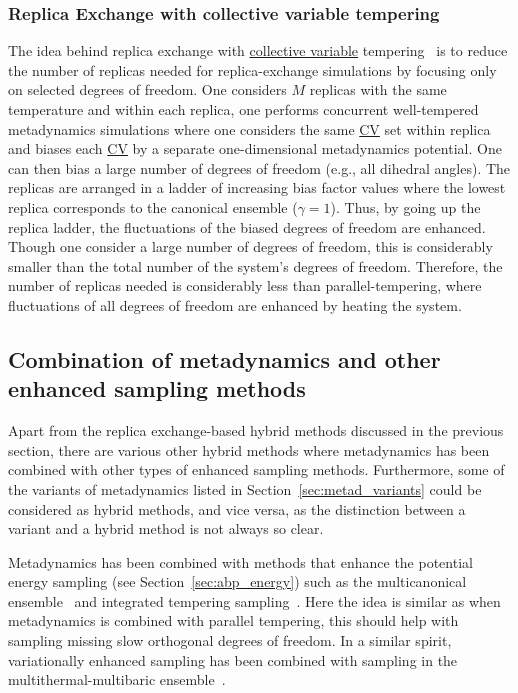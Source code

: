 \documentclass[9pt,review]{livecoms}
\begin{document}
\subsubsection{Replica Exchange with collective variable tempering}

The idea behind replica exchange with \hyperlink{ref:CV} {collective variable} tempering~\cite{Gil-Ley_JCTC-2015} is to reduce the number of replicas needed for replica-exchange simulations by focusing only on selected degrees of freedom. One considers $M$ replicas with the same temperature and within each replica, one performs concurrent well-tempered metadynamics simulations where one considers the same \hyperlink{ref:CV} {CV} set within replica and biases each \hyperlink{ref:CV} {CV} by a separate one-dimensional metadynamics potential. One can then bias a large number of degrees of freedom (e.g., all dihedral angles). The replicas are arranged in a ladder of increasing bias factor values where the lowest replica corresponds to the canonical ensemble ($\gamma=1$). Thus, by going up the replica ladder, the fluctuations of the biased degrees of freedom are enhanced. Though one consider a large number of degrees of freedom, this is considerably smaller than the total number of the system's degrees of freedom. Therefore, the number of replicas needed is considerably less than parallel-tempering, where fluctuations of all degrees of freedom are enhanced by heating the system.

\subsection{Combination of metadynamics and other enhanced sampling methods}

Apart from the replica exchange-based hybrid methods discussed in the previous section, there are various other hybrid methods where metadynamics has been combined with other types of enhanced sampling methods. Furthermore, some of the variants of metadynamics listed in Section~\ref{sec:metad_variants} could be considered as hybrid methods, and vice versa, as the distinction between a variant and a hybrid method is not always so clear.

Metadynamics has been combined with methods that enhance the potential energy sampling (see Section~\ref{sec:abp_energy}) such as the multicanonical ensemble~\cite{Yonezawa_MulticanonicalMetaD_2011} and integrated tempering sampling~\cite{Yang_MetaD-ITS_1_2016,Yang_MetaD-ITS_2_2018}. Here the idea is similar as when metadynamics is combined with parallel tempering, this should help with sampling missing slow orthogonal degrees of freedom. In a similar spirit, variationally enhanced sampling has been combined with sampling in the multithermal-multibaric ensemble~\cite{Piaggi_MultiVES_2019,Piaggi_MultiVES+CV_2019}.
\end{document}
